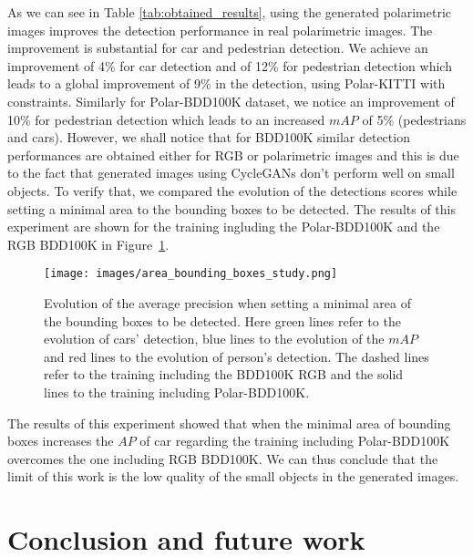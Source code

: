As we can see in Table \ref{tab:obtained_results}, using the generated polarimetric images improves the detection performance in real polarimetric images. The improvement is substantial for car and pedestrian detection. We achieve an improvement of 4\% for car detection and of 12\% for pedestrian detection which leads to a global improvement of 9\% in the detection, using Polar-KITTI with constraints. Similarly for Polar-BDD100K dataset, we notice an improvement of 10\% for pedestrian detection which leads to an increased $mAP$ of 5\% (pedestrians and cars). However, we shall notice that for BDD100K similar detection performances are obtained either for RGB or polarimetric images and this is due to the fact that generated images using CycleGANs don't perform well on small objects. To verify that, we compared the evolution of the detections scores while setting a minimal area to the bounding boxes to be detected. The results of this experiment are shown for the training ingluding the Polar-BDD100K and the RGB BDD100K in Figure~\ref{fig:bounding_boxes}.

\begin{figure}
	\centering
	\texttt{[image: images/area\_bounding\_boxes\_study.png]}
	\caption{Evolution of the average precision when setting a minimal area of the bounding boxes to be detected. Here green lines refer to the evolution of cars' detection, blue lines to the evolution of the $mAP$ and red lines to the evolution of person's detection. The dashed lines refer to the training including the BDD100K RGB and the solid lines to the training including Polar-BDD100K.}
	\label{fig:bounding_boxes}
\end{figure}

The results of this experiment showed that when the minimal area of bounding boxes increases the $AP$ of car regarding the training including Polar-BDD100K overcomes the one including RGB BDD100K. We can thus conclude that the limit of this work is the low quality of the small objects in the generated images. 

\section{Conclusion and future work}

